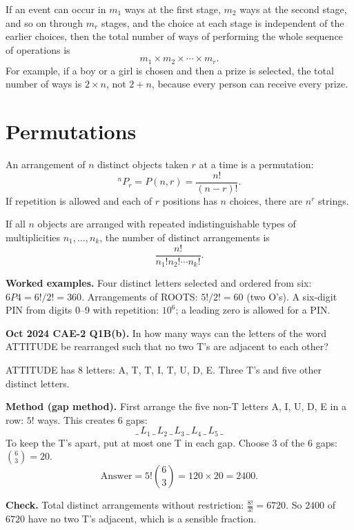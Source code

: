 \documentclass[11pt,a4paper]{article}
\begin{document}
\begin{solbox}
If an event can occur in $m_1$ ways at the first stage, $m_2$ ways at the second stage, and so on through $m_r$ stages, and the choice at each stage is independent of the earlier choices, then the total number of ways of performing the whole sequence of operations is
\[
m_1\times m_2\times\cdots\times m_r.
\]
For example, if a boy or a girl is chosen and then a prize is selected, the total number of ways is $2\times n$, not $2+n$, because every person can receive every prize.
\end{solbox}

\section{Permutations}

An arrangement of $n$ distinct objects taken $r$ at a time is a permutation:
\[
{}^nP_r=P(n,r)=\frac{n!}{(n-r)!}.
\]
If repetition is allowed and each of $r$ positions has $n$ choices, there are $n^r$ strings.

If all $n$ objects are arranged with repeated indistinguishable types of multiplicities $n_1,\dots,n_k$, the number of distinct arrangements is
\[
\frac{n!}{n_1!n_2!\cdots n_k!}.
\]

\begin{exambox}
\textbf{Worked examples.} Four distinct letters selected and ordered from six: $6P4=6!/2!=360$. Arrangements of ROOTS: $5!/2!=60$ (two O's). A six-digit PIN from digits 0--9 with repetition: $10^6$; a leading zero is allowed for a PIN.
\end{exambox}

\begin{pyqbox}
\textbf{Oct 2024 CAE-2 Q1B(b).} In how many ways can the letters of the word ATTITUDE be rearranged such that no two T's are adjacent to each other?
\end{pyqbox}

\begin{solbox}
ATTITUDE has 8 letters: A, T, T, I, T, U, D, E. Three T's and five other distinct letters.

\textbf{Method (gap method).} First arrange the five non-T letters A, I, U, D, E in a row: $5!$ ways. This creates 6 gaps:
\[
\_\,L_1\,\_\,L_2\,\_\,L_3\,\_\,L_4\,\_\,L_5\,\_
\]
To keep the T's apart, put at most one T in each gap. Choose 3 of the 6 gaps: $\binom63=20$.
\[
\text{Answer}=5!\binom63=120\times20=\boxed{2400}.
\]

\textbf{Check.} Total distinct arrangements without restriction: $\frac{8!}{3!}=6720$. So $2400$ of $6720$ have no two T's adjacent, which is a sensible fraction.
\end{solbox}
\end{document}
